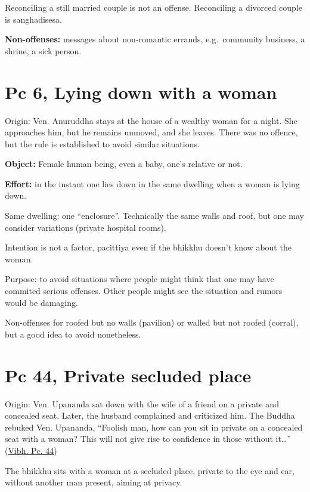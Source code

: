 Reconciling a still married couple is not an offense. Reconciling a
divorced couple is sanghadisesa.

\textbf{Non-offenses:} messages about non-romantic errands,
e.g.~community business, a shrine, a sick person.

\section{Pc 6, Lying down with a woman}

Origin: Ven. Anuruddha stays at the house of a wealthy woman for a
night. She approaches him, but he remains unmoved, and she leaves. There
was no offence, but the rule is established to avoid similar situations.

\textbf{Object:} Female human being, even a baby, one's relative or not.

\textbf{Effort:} in the instant one lies down in the same dwelling when
a woman is lying down.

Same dwelling: one ``enclosure''. Technically the same walls and roof,
but one may consider variations (private hospital rooms).

Intention is not a factor, pacittiya even if the bhikkhu doesn't know
about the woman.

Purpose: to avoid situations where people might think that one may have
commited serious offenses. Other people might see the situation and
rumors would be damaging.

Non-offenses for roofed but no walls (pavilion) or walled but not roofed
(corral), but a good idea to avoid nonetheless.

\clearpage

\section{Pc 44, Private secluded place}

Origin: Ven. Upananda sat down with the wife of a friend on a private
and concealed seat. Later, the husband complained and criticized him.
The Buddha rebuked Ven. Upananda, ``Foolish man, how can you sit in
private on a concealed seat with a woman? This will not give rise to
confidence in those without it\ldots{}''
(\href{https://suttacentral.net/pli-tv-bu-vb-pc44/en/brahmali}{Vibh. Pc.
44})

The bhikkhu sits with a woman at a secluded place, private to the eye
and ear, without another man present, aiming at privacy.

